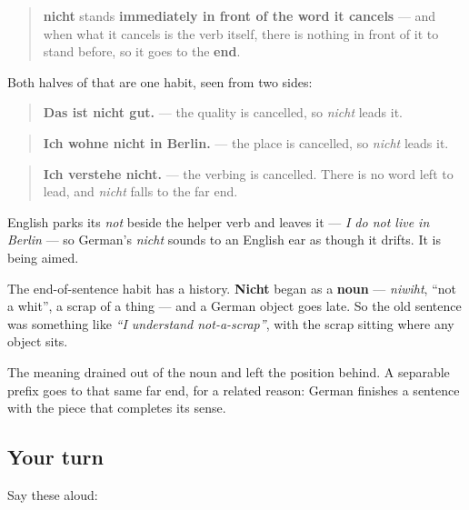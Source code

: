 \begin{grammarlens}[title={Grammar Lens: it stands in front of what it cancels}]
\begin{quote}
\textbf{nicht} stands \textbf{immediately in front of the word it cancels} — and when what it cancels is the verb itself, there is nothing in front of it to stand before, so it goes to the \textbf{end}.
\end{quote}

Both halves of that are one habit, seen from two sides:

\begin{quote}
\textbf{Das ist nicht gut.} — the quality is cancelled, so \emph{nicht} leads it.
\end{quote}

\begin{quote}
\textbf{Ich wohne nicht in Berlin.} — the place is cancelled, so \emph{nicht} leads it.
\end{quote}

\begin{quote}
\textbf{Ich verstehe nicht.} — the verbing is cancelled. There is no word left to lead, and \emph{nicht} falls to the far end.
\end{quote}

English parks its \emph{not} beside the helper verb and leaves it — \emph{I do not live in Berlin} — so German's \emph{nicht} sounds to an English ear as though it drifts. It is being aimed.
\end{grammarlens}

\begin{culture}
The end-of-sentence habit has a history. \textbf{Nicht} began as a \textbf{noun} — \emph{niwiht}, \textquotedblleft{}not a whit\textquotedblright{}, a scrap of a thing — and a German object goes late. So the old sentence was something like \emph{\textquotedblleft{}I understand not-a-scrap\textquotedblright{}}, with the scrap sitting where any object sits.

The meaning drained out of the noun and left the position behind. A separable prefix goes to that same far end, for a related reason: German finishes a sentence with the piece that completes its sense.
\end{culture}

\subsection*{Your turn}
Say these aloud:

